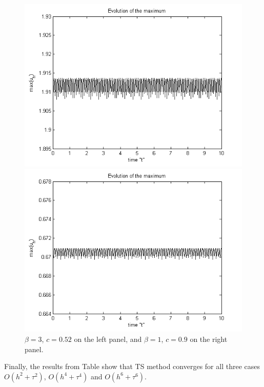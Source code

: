 \documentclass[11pt,a4paper,twoside]{article}
\begin{document}
\begin{figure}[!htbp]
	\centering
	\begin{minipage}[b]{0.35\linewidth}
		\includegraphics[width=\linewidth]{Pictures/EvolutionOfMaximum_bt3.png}
	\end{minipage}	
	\begin{minipage}[b]{0.35\linewidth}
		 \includegraphics[width=\linewidth]{Pictures/EvolutionOfMaximum_bt1.png}
	\end{minipage}

	\caption{$\beta = 3$, $c=0.52$ on the left panel, and $\beta = 1$, $c=0.9$ on the right panel.}
	\label{fig:solMax}
\end{figure}
Finally, the results from Table  show that TS method converges for all three cases $O(h^2 + \tau^2)$, $O(h^4 + \tau^4)$ and  $O(h^6 + \tau^6)$.
\end{document}
